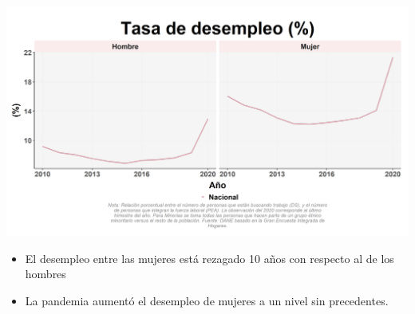 \documentclass[aspectratio=169]{beamer}
\begin{document}
        \begin{slide}{15} 
            \begin{imagecolumn}
                \includegraphics[width=\columnwidth]{img/var_49_trend.png}
            \end{imagecolumn}
            \begin{textcolumn}
                \begin{itemize}
                    \item El desempleo entre las mujeres está rezagado 10 años con respecto al de los hombres
                    \item La pandemia aumentó el desempleo de mujeres a un nivel sin precedentes.
                \end{itemize}
            \end{textcolumn}
    \printcolumns
    \end{slide}
    
\end{document}
